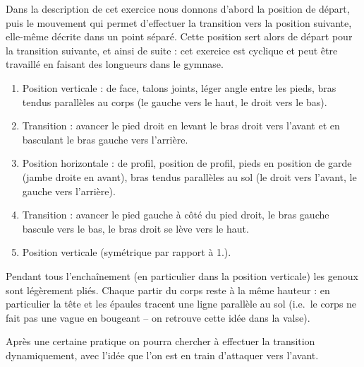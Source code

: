 \begin{exercice}
\label{struc:ex:roue-avant}


Dans la description de cet exercice nous donnons d'abord la position de départ, puis le mouvement qui permet d'effectuer la transition vers la position suivante, elle-même décrite dans un point séparé.
Cette position sert alors de départ pour la transition suivante, et ainsi de suite : cet exercice est cyclique et peut être travaillé en faisant des longueurs dans le gymnase.

\begin{enumerate}
	\item Position verticale : de face, talons joints, léger angle entre les pieds, bras tendus parallèles au corps (le gauche vers le haut, le droit vers le bas).
	
	\item Transition : avancer le pied droit en levant le bras droit vers l'avant et en basculant le bras gauche vers l'arrière.
	
	\item Position horizontale : de profil, position de profil, pieds en position de garde (jambe droite en avant), bras tendus parallèles au sol (le droit vers l'avant, le gauche vers l'arrière).
	
	\item Transition : avancer le pied gauche à côté du pied droit, le bras gauche bascule vers le bas, le bras droit se lève vers le haut.
	
	\item Position verticale (symétrique par rapport à 1.).
\end{enumerate}

Pendant tous l'enchaînement (en particulier dans la position verticale) les genoux sont légèrement pliés.
Chaque partir du corps reste à la même hauteur : en particulier la tête et les épaules tracent une ligne parallèle au sol (i.e.\ le corps ne fait pas une vague en bougeant -- on retrouve cette idée dans la valse).

Après une certaine pratique on pourra chercher à effectuer la transition dynamiquement, avec l'idée que l'on est en train d'attaquer vers l'avant.

\end{exercice}


